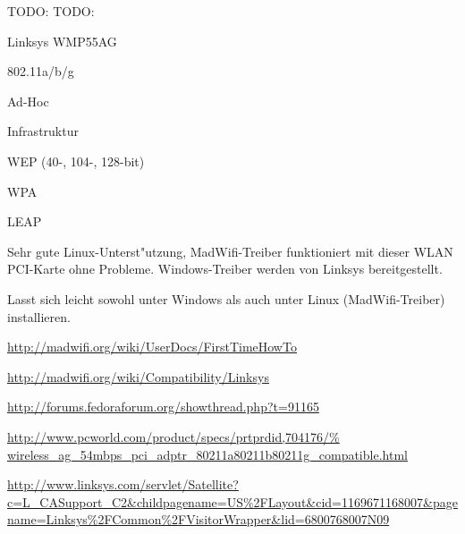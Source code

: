 TODO: 
TODO: 
%
%
\begin{wlandevice}{Linksys WMP55AG}



\begin{wlanieeestandard}
\item 802.11a/b/g
\end{wlanieeestandard}

\begin{wlanmode}
\item Ad-Hoc
\item Infrastruktur
\end{wlanmode}

\begin{wlansecurity}
\item WEP (40-, 104-, 128-bit)
\item WPA
\item LEAP
\end{wlansecurity}

\begin{wlandriver}
\item
Sehr gute Linux-Unterst"utzung, MadWifi-Treiber funktioniert
mit dieser WLAN PCI-Karte ohne Probleme.
Windows-Treiber werden von Linksys bereitgestellt.
\end{wlandriver}


\begin{wlaninstall}
\item
Lasst sich leicht sowohl unter Windows als auch unter Linux (MadWifi-Treiber)
installieren.

\url{http://madwifi.org/wiki/UserDocs/FirstTimeHowTo}
\end{wlaninstall}

\begin{wlanlink}
\item \url{http://madwifi.org/wiki/Compatibility/Linksys}
\item \url{http://forums.fedoraforum.org/showthread.php?t=91165}
\item \url{http://www.pcworld.com/product/specs/prtprdid,704176/%
	wireless_ag_54mbps_pci_adptr_80211a80211b80211g_compatible.html}
\item \url{http://www.linksys.com/servlet/Satellite?c=L_CASupport_C2&childpagename=US\%2FLayout&cid=1169671168007&pagename=Linksys\%2FCommon\%2FVisitorWrapper&lid=6800768007N09}
\end{wlanlink}

\end{wlandevice}

